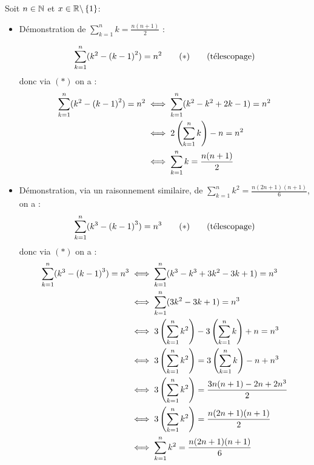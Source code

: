 \begin{dem}
	Soit \(n \in \mathbb{N}\) et \(x\in\mathbb{R}\backslash\left\lbrace1\right\rbrace\):
	\begin{itemize}
		\item Démonstration de \(\sum_{k=1}^n k = \frac{n(n+1)}{2}\) :

		      \[
			      \sum_{k=1}^n (k^2-\paren{k-1}^2) = n^2 \qquad (*) \qquad \hfill \text{(télescopage)}
		      \]
		      donc via \((*)\) on a :
		      \begin{align*}
			      \sum_{k=1}^n (k^2-\left(k-1\right)^2) = n^2 & \iff \sum_{k=1}^n (k^2-k^2+2k-1) = n^2 \\
			                                             & \iff 2\left(\sum_{k=1}^n k\right) -n = n^2  \\
			                                             & \iff \sum_{k=1}^n k = \frac{n(n+1)}{2} \\
		      \end{align*}
		\item Démonstration, via un raisonnement similaire, de \(\sum_{k=1}^n k^2 = \frac{n(2n+1)(n+1)}{6}\), on a :
		      \[
			      \sum_{k=1}^n (k^3-\paren{k-1}^3) = n^3 \qquad (*) \qquad \hfill \text{(télescopage)}
		      \]
		      donc via \((*)\) on a :
		      \begin{align*}
			      \sum_{k=1}^n (k^3-\left(k-1\right)^3) = n^3 & \iff \sum_{k=1}^n (k^3-k^3 + 3k^2-3k+1) = n^3                      \\
			                                             & \iff \sum_{k=1}^n (3k^2-3k+1)  = n^3                               \\
			                                             & \iff 3\left(\sum_{k=1}^n k^2\right) -3\left(\sum_{k=1}^{n}k\right) + n =n^3  \\
			                                             & \iff 3\left(\sum_{k=1}^n k^2\right) = 3\left(\sum_{k=1}^{n}k\right) - n +n^3 \\
			                                             & \iff 3\left(\sum_{k=1}^n k^2\right) = \frac{3n(n+1)-2n+2n^3}{2}         \\
			                                             & \iff 3\left(\sum_{k=1}^n k^2\right) = \frac{n(2n+1)(n+1)}{2}            \\
			                                             & \iff \sum_{k=1}^n k^2 = \frac{n(2n+1)(n+1)}{6}                     \\
		      \end{align*}


\end{itemize}
\end{dem}

